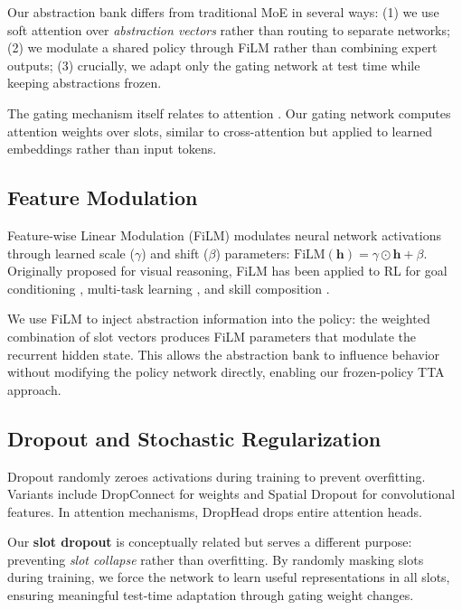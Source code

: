 \documentclass{article}
\begin{document}
Our abstraction bank differs from traditional MoE in several ways: (1) we use soft attention over \emph{abstraction vectors} rather than routing to separate networks; (2) we modulate a shared policy through FiLM rather than combining expert outputs; (3) crucially, we adapt only the gating network at test time while keeping abstractions frozen.

The gating mechanism itself relates to attention \citep{bahdanau2015neural, vaswani2017attention}. Our gating network computes attention weights over slots, similar to cross-attention but applied to learned embeddings rather than input tokens.

\subsection{Feature Modulation}

Feature-wise Linear Modulation (FiLM) \citep{perez2018film} modulates neural network activations through learned scale ($\gamma$) and shift ($\beta$) parameters: $\text{FiLM}(\mathbf{h}) = \gamma \odot \mathbf{h} + \beta$. Originally proposed for visual reasoning, FiLM has been applied to RL for goal conditioning \citep{barreto2020fast}, multi-task learning \citep{sodhani2021multi}, and skill composition \citep{peng2019mcp}.

We use FiLM to inject abstraction information into the policy: the weighted combination of slot vectors produces FiLM parameters that modulate the recurrent hidden state. This allows the abstraction bank to influence behavior without modifying the policy network directly, enabling our frozen-policy TTA approach.

\subsection{Dropout and Stochastic Regularization}

Dropout \citep{srivastava2014dropout} randomly zeroes activations during training to prevent overfitting. Variants include DropConnect \citep{wan2013regularization} for weights and Spatial Dropout \citep{tompson2015efficient} for convolutional features. In attention mechanisms, DropHead \citep{zhou2020scheduled} drops entire attention heads.

Our \textbf{slot dropout} is conceptually related but serves a different purpose: preventing \emph{slot collapse} rather than overfitting. By randomly masking slots during training, we force the network to learn useful representations in all slots, ensuring meaningful test-time adaptation through gating weight changes.
\end{document}
